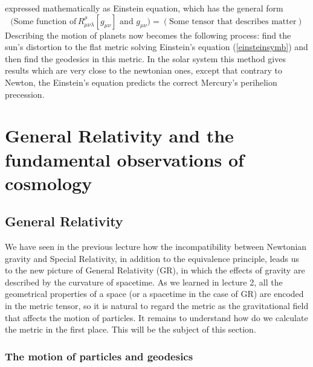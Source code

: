 \documentclass[11pt, a4paper,oneside,openright]{book}
\numberwithin{equation}{section}
\begin{document}
expressed mathematically as Einstein equation, which has the general form
\begin{equation}
\label{einsteinsymb}
\mathrm{(Some \,\,function\,\, of }\,R_{\mu\nu\lambda}^\rho[g_{\mu\nu}] \mathrm{ \,\,and\,\, } g_{\mu\nu})= \mathrm{(Some\,\, tensor \,\,that\,\, describes\,\, matter)}
\end{equation}
Describing the motion of planets now becomes the following process: find the sun's distortion to the flat metric solving Einstein's equation (\ref{einsteinsymb}) and then find the geodesics in this metric. In the solar system this method gives results which are very close to the newtonian ones, except that contrary to Newton, the Einstein's equation predicts the correct Mercury's perihelion precession.


\chapter{General Relativity and the fundamental observations of cosmology}

\section{General Relativity}

We have seen in the previous lecture how the incompatibility between Newtonian gravity and Special Relativity, in addition to the equivalence principle, leads us to the new picture of General Relativity (GR), in which the effects of gravity are described by the curvature of spacetime. As we learned in lecture 2, all the geometrical properties of a space (or a spacetime in the case of GR) are encoded in the metric tensor, so it is natural to regard the metric as the gravitational field that affects the motion of particles. It remains to understand how do we calculate the metric in the first place. This will be the subject of this section.

\subsection{The motion of particles and geodesics}
\end{document}
